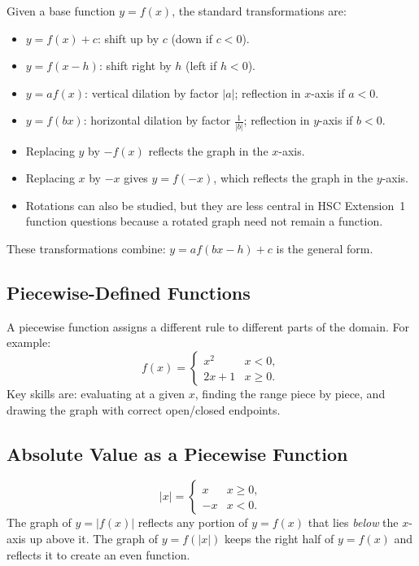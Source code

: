\documentclass[12pt]{article}
\theoremstyle{definition}
\begin{document}
Given a base function $y = f(x)$, the standard transformations are:

\begin{itemize}[leftmargin=*]
  \item $y = f(x) + c$: shift up by $c$ (down if $c < 0$).
  \item $y = f(x - h)$: shift right by $h$ (left if $h < 0$).
  \item $y = af(x)$: vertical dilation by factor $|a|$; reflection in $x$-axis if $a < 0$.
  \item $y = f(bx)$: horizontal dilation by factor $\tfrac{1}{|b|}$; reflection in $y$-axis if $b < 0$.
  \item Replacing $y$ by $-f(x)$ reflects the graph in the $x$-axis.
  \item Replacing $x$ by $-x$ gives $y=f(-x)$, which reflects the graph in the $y$-axis.
  \item Rotations can also be studied, but they are less central in HSC Extension~1 function questions because a rotated graph need not remain a function.
\end{itemize}

These transformations combine: $y = af(bx - h) + c$ is the general form.

\subsection{Piecewise-Defined Functions}
A piecewise function assigns a different rule to different parts of the domain. For example:
\[
f(x) = \begin{cases} x^2 & x < 0, \\ 2x+1 & x \ge 0. \end{cases}
\]
Key skills are: evaluating at a given $x$, finding the range piece by piece, and drawing the graph with correct open/closed endpoints.

\subsection{Absolute Value as a Piecewise Function}
\[
|x| = \begin{cases} x & x \ge 0, \\ -x & x < 0. \end{cases}
\]
The graph of $y = |f(x)|$ reflects any portion of $y = f(x)$ that lies \emph{below} the $x$-axis up above it. The graph of $y = f(|x|)$ keeps the right half of $y = f(x)$ and reflects it to create an even function.
\end{document}
